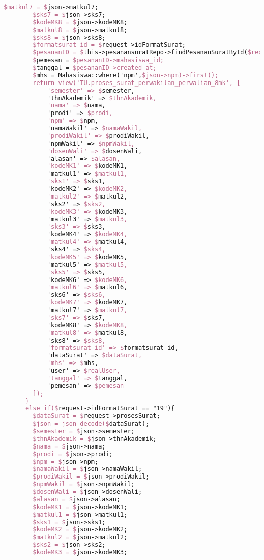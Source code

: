 \begin{lstlisting}[language=tex,basicstyle=\tiny,caption=PesanansuratController.php]
        $matkul7 = $json->matkul7;
        $sks7 = $json->sks7;
        $kodeMK8 = $json->kodeMK8;
        $matkul8 = $json->matkul8;
        $sks8 = $json->sks8;
        $formatsurat_id = $request->idFormatSurat;
        $pesananID = $this->pesanansuratRepo->findPesananSuratById($request->id);
        $pemesan = $pesananID->mahasiswa_id;
        $tanggal = $pesananID->created_at;
        $mhs = Mahasiswa::where('npm',$json->npm)->first();
        return view('TU.proses_surat_perwakilan_perwalian_8mk', [
            'semester' => $semester,
            'thnAkademik' => $thnAkademik,
            'nama' => $nama,
            'prodi' => $prodi,
            'npm' => $npm,
            'namaWakil' => $namaWakil,
            'prodiWakil' => $prodiWakil,
            'npmWakil' => $npmWakil,
            'dosenWali' => $dosenWali,
            'alasan' => $alasan,
            'kodeMK1' => $kodeMK1,
            'matkul1' => $matkul1,
            'sks1' => $sks1,
            'kodeMK2' => $kodeMK2,
            'matkul2' => $matkul2,
            'sks2' => $sks2,
            'kodeMK3' => $kodeMK3,
            'matkul3' => $matkul3,
            'sks3' => $sks3,
            'kodeMK4' => $kodeMK4,
            'matkul4' => $matkul4,
            'sks4' => $sks4,
            'kodeMK5' => $kodeMK5,
            'matkul5' => $matkul5,
            'sks5' => $sks5,
            'kodeMK6' => $kodeMK6,
            'matkul6' => $matkul6,
            'sks6' => $sks6,
            'kodeMK7' => $kodeMK7,
            'matkul7' => $matkul7,
            'sks7' => $sks7,
            'kodeMK8' => $kodeMK8,
            'matkul8' => $matkul8,
            'sks8' => $sks8,
            'formatsurat_id' => $formatsurat_id,
            'dataSurat' => $dataSurat,
            'mhs' => $mhs,
            'user' => $realUser,
            'tanggal' => $tanggal,
            'pemesan' => $pemesan
        ]);
      }
      else if($request->idFormatSurat == "19"){
        $dataSurat = $request->prosesSurat;
        $json = json_decode($dataSurat);
        $semester = $json->semester;
        $thnAkademik = $json->thnAkademik;
        $nama = $json->nama;
        $prodi = $json->prodi;
        $npm = $json->npm;
        $namaWakil = $json->namaWakil;
        $prodiWakil = $json->prodiWakil;
        $npmWakil = $json->npmWakil;
        $dosenWali = $json->dosenWali;
        $alasan = $json->alasan;
        $kodeMK1 = $json->kodeMK1;
        $matkul1 = $json->matkul1;
        $sks1 = $json->sks1;
        $kodeMK2 = $json->kodeMK2;
        $matkul2 = $json->matkul2;
        $sks2 = $json->sks2;
        $kodeMK3 = $json->kodeMK3;

\end{lstlisting}
